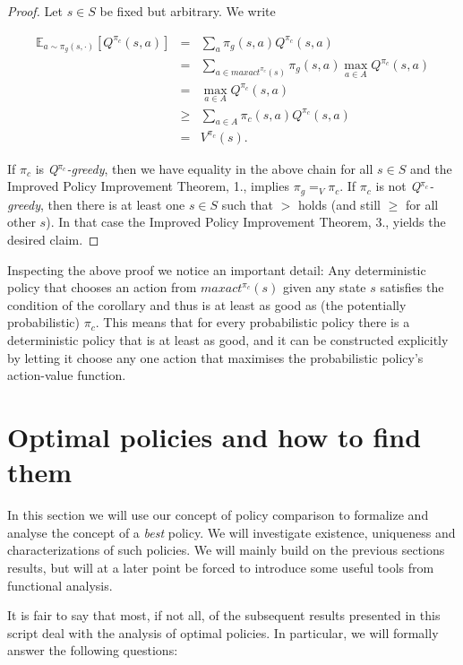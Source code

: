 \documentclass[11pt]{article} %
\begin{document}
\begin{proof}
	Let $s \in S$ be fixed but arbitrary. We write

	\[
		\begin{array}{rll}
			\mathbb{E}_{a \sim \pi_g(s,\cdot)}[Q^{\pi_c}(s,a)] 	& = & \sum_a \pi_g(s,a) Q^{\pi_c}(s,a) \\
													& = & \sum _{a \in maxact^{\pi_c}(s)} \pi_g(s,a) \max_{a \in A} Q^{\pi_c}(s,a) \\
													& = & \max_{a \in A} Q^{\pi_c}(s,a) \\
													& \ge & \sum_{a \in A} \pi_c(s,a) Q^{\pi_c}(s,a) \\
													& = & V^{\pi_c}(s).
		\end{array}
	\]

	If $\pi_c$ is \textit{Q}$^{\pi_c}$\textit{-greedy}, then we have equality in the above chain for all $s \in S$ and the Improved Policy Improvement Theorem, 1., implies $\pi_g =_V \pi_c$. If $\pi_c$ is not \textit{Q}$^{\pi_c}$\textit{-greedy}, then there is at least one $s \in S$ such that $>$ holds (and still $\ge$ for all other $s$). In that case the Improved Policy Improvement Theorem, 3., yields the desired claim.
\end{proof}

Inspecting the above proof we notice an important detail: Any deterministic policy that chooses an action from $maxact^{\pi_c}(s)$ given any state $s$ satisfies the condition of the corollary and thus is at least as good as (the potentially probabilistic) $\pi_c$. This means that for every probabilistic policy there is a deterministic policy that is at least as good, and it can be constructed explicitly by letting it choose any one action that maximises the probabilistic policy's action-value function.

\newpage

\section{Optimal policies and how to find them}

In this section we will use our concept of policy comparison to formalize and analyse the concept of a \textit{best} policy. We will investigate existence, uniqueness and characterizations of such policies. We will mainly build on the previous sections results, but will at a later point be forced to introduce some useful tools from functional analysis.

It is fair to say that most, if not all, of the subsequent results presented in this script deal with the analysis of optimal policies. In particular, we will formally answer the following questions:
\end{document}
